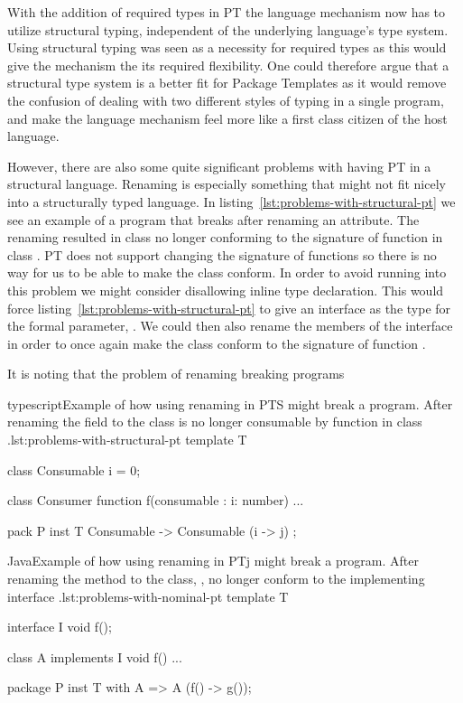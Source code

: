 With the addition of required types in PT the language mechanism now has to utilize structural typing, independent of the underlying language's type system.
Using structural typing was seen as a necessity for required types as this would give the mechanism the its required flexibility.
One could therefore argue that a structural type system is a better fit for Package Templates as it would remove the confusion of dealing with two different styles of typing in a single program, and make the language mechanism feel more like a first class citizen of the host language.

However, there are also some quite significant problems with having PT in a structural language.
Renaming is especially something that might not fit nicely into a structurally typed language.
In listing~\vref{lst:problems-with-structural-pt} we see an example of a program that breaks after renaming an attribute.
The renaming resulted in class  no longer conforming to the signature of function  in class .
PT does not support changing the signature of functions so there is no way for us to be able to make the  class conform.
In order to avoid running into this problem we might consider disallowing inline type declaration.
This would force listing~\vref{lst:problems-with-structural-pt} to give an interface as the type for the formal parameter, .
We could then also rename the members of the interface in order to once again make the  class conform to the signature of function .

It is noting that the problem of renaming breaking programs

\begin{code}{typescript}{Example of how using renaming in PTS might break a program. After renaming the field  to  the class  is no longer consumable by function  in class .}{lst:problems-with-structural-pt}
    template T {
        class Consumable {
            i = 0;
        }

        class Consumer {
            function f(consumable : {i: number}) {
                ...
            }
        }
    }

    pack P {
        inst T { Consumable -> Consumable (i -> j) };
    }
\end{code}

\begin{code}{Java}{Example of how using renaming in PTj might break a program. After renaming the method  to  the class, , no longer conform to the implementing interface .}{lst:problems-with-nominal-pt}
    template T {
        interface I {
            void f();
        }

        class A implements I {
            void f() { ... }
        }
    }

    package P {
        inst T with A => A (f() -> g());
    }
\end{code}

